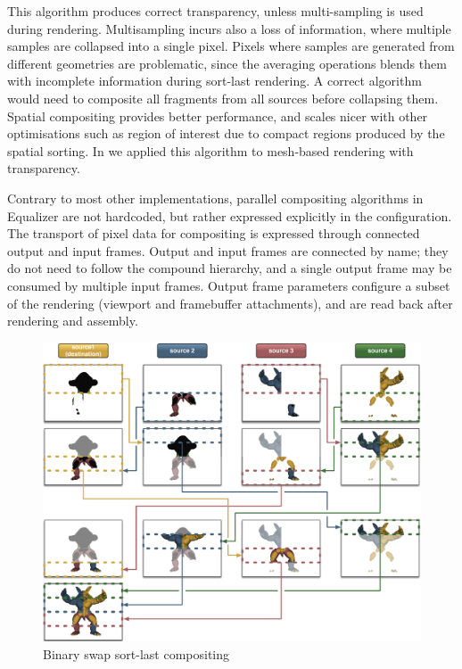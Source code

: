 This algorithm produces correct transparency, unless multi-sampling is used
during rendering. Multisampling incurs also a loss of information, where
multiple samples are collapsed into a single pixel. Pixels where samples are
generated from different geometries are problematic, since the averaging
operations blends them with incomplete information during sort-last rendering. A
correct algorithm would need to composite all fragments from all sources before
collapsing them. Spatial compositing provides better performance, and scales
nicer with other optimisations such as region of interest due to compact regions
produced by the spatial sorting. In \cite{EBAHMP:12} we applied this algorithm
to mesh-based rendering with transparency.

Contrary to most other implementations, parallel compositing algorithms in
Equalizer are not hardcoded, but rather expressed explicitly in the
configuration. The transport of pixel data for compositing is expressed through
connected output and input frames. Output and input frames are connected by
name; they do not need to follow the compound hierarchy, and a single output
frame may be consumed by multiple input frames. Output frame parameters
configure a subset of the rendering (viewport and framebuffer attachments), and
are read back after rendering and assembly.

\begin{figure}[h!t]\center
 \includegraphics[width=\columnwidth]{images/binarySwap}
 {\caption{\label{fBS}Binary swap sort-last compositing}}
\end{figure}

